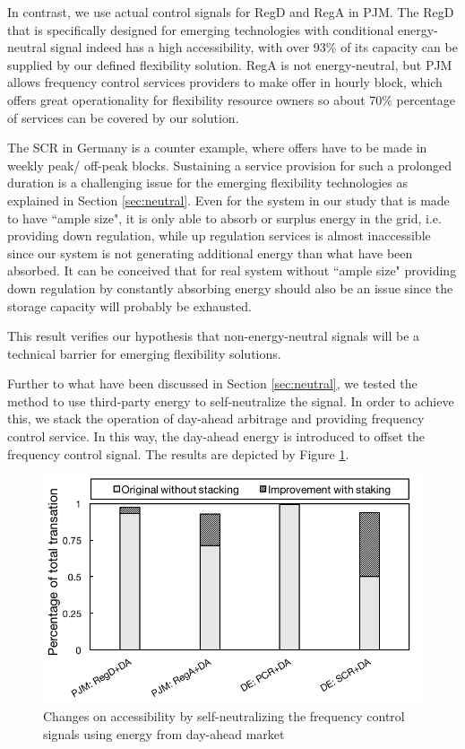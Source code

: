 In contrast, we use actual control signals for RegD and RegA in PJM. The RegD that is specifically designed for emerging technologies with conditional energy-neutral signal indeed has a high accessibility, with over 93\% of its capacity can be supplied by our defined flexibility solution. RegA is not energy-neutral, but PJM allows frequency control services providers to make offer in hourly block, which offers great operationality for flexibility resource owners so about 70\% percentage of services can be covered by our solution. 

The SCR in Germany is a counter example, where offers have to be made in weekly peak/ off-peak blocks. Sustaining a service provision for such a prolonged duration is a challenging issue for the emerging flexibility technologies as explained in Section \ref{sec:neutral}. Even for the system in our study that is made to have ``ample size", it is only able to absorb or surplus energy in the grid, i.e. providing down regulation, while up regulation services is almost inaccessible since our system is not generating additional energy than what have been absorbed. It can be conceived that for real system without ``ample size" providing down regulation by constantly absorbing energy should also be an issue since the storage capacity will probably be exhausted.

This result verifies our hypothesis that non-energy-neutral signals will be a technical barrier for emerging flexibility solutions.

Further to what have been discussed in Section \ref{sec:neutral}, we tested the method to use third-party energy to self-neutralize the signal. In order to achieve this, we stack the operation of day-ahead arbitrage and providing frequency control service. In this way, the day-ahead energy is introduced to offset the frequency control signal. The results are depicted by Figure \ref{fig:Nuetralize}.

\begin{figure}[h!]
	\centering
	\includegraphics[width=0.95\linewidth]{Figures/Neutralize}
	\caption{Changes on accessibility by self-neutralizing the frequency control signals using energy from day-ahead market}
	\label{fig:Nuetralize}
\end{figure}

